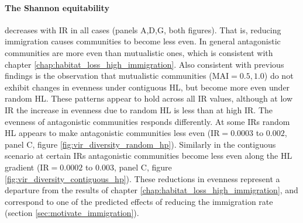 \paragraph*{The Shannon equitability} decreases with IR in all cases (panels A,D,G, both figures). That is, reducing immigration causes communities to become less even. In general antagonistic communities are more even than mutualistic ones, which is consistent with chapter \ref{chap:habitat_loss_high_immigration}. Also consistent with previous findings is the observation that mutualistic communities (MAI$=0.5,1.0$) do not exhibit changes in evenness under contiguous HL, but become more even under random HL. These patterns appear to hold across all IR values, although at low IR the increase in evenness due to random HL is less than at high IR. The evenness of antagonistic communities responds differently. At some IRs random HL appears to make antagonistic communities less even (IR$=0.0003$ to $0.002$, panel C, figure \ref{fig:vir_diversity_random_hp}). Similarly in the contiguous scenario at certain IRs antagonistic communities become less even along the HL gradient (IR$=0.0002$ to $0.003$, panel C, figure \ref{fig:vir_diversity_contiguous_hp}). These reductions in evenness represent a departure from the results of chapter \ref{chap:habitat_loss_high_immigration}, and correspond to one of the predicted effects of reducing the immigration rate (section \ref{sec:motivate_immigration}).
